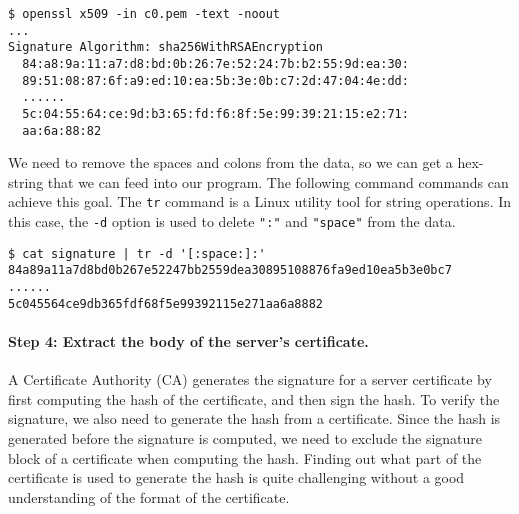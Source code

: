 \begin{lstlisting}
$ openssl x509 -in c0.pem -text -noout 
...
Signature Algorithm: sha256WithRSAEncryption
  84:a8:9a:11:a7:d8:bd:0b:26:7e:52:24:7b:b2:55:9d:ea:30:
  89:51:08:87:6f:a9:ed:10:ea:5b:3e:0b:c7:2d:47:04:4e:dd:
  ......
  5c:04:55:64:ce:9d:b3:65:fd:f6:8f:5e:99:39:21:15:e2:71:
  aa:6a:88:82
\end{lstlisting}

We need to remove the spaces and colons from the data, so we can get 
a hex-string that we can feed into our program. The following command 
commands can achieve this goal. The \texttt{tr} command is a Linux utility tool for 
string operations. In this case, the \texttt{-d} option is used to delete \texttt{":"} and 
\texttt{"space"} from the data.

\begin{lstlisting}
$ cat signature | tr -d '[:space:]:'
84a89a11a7d8bd0b267e52247bb2559dea30895108876fa9ed10ea5b3e0bc7
......
5c045564ce9db365fdf68f5e99392115e271aa6a8882
\end{lstlisting}
 


\begin{comment}
\begin{lstlisting}
$ openssl x509 -in Chase.crt -text -noout -certopt ca_default 
               -certopt no_validity -certopt no_serial 
	       -certopt no_subject -certopt no_extensions 
	       -certopt no_signame | grep -v 'Signature Algorithm' 
	                           | tr -d '[:space:]:'
\end{lstlisting}
\end{comment}



\paragraph{Step 4: Extract the body of the server's certificate.}
A Certificate Authority (CA) generates the signature for a server certificate by first 
computing the hash of the certificate, and then sign the hash. To
verify the signature, we also need to generate the hash from a 
certificate. Since the hash is generated before the signature is computed, 
we need to exclude the signature block of a certificate when computing the 
hash. Finding out what part of the certificate is used to 
generate the hash is quite challenging without a good understanding 
of the format of the certificate. 




